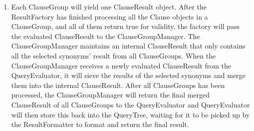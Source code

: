 \documentclass[12pt]{article}
\begin{document}
{{{{{{{{{{{{{\begin{enumerate}
\begin{figure}[H]
\end{figure}
For the case of 1 new synonym and 1 existing synonym, the ClauseResult will do the merging of result using \textit{hash join}. An unordered\_map<int, list<int> > will be created to help with the merging process, this unordered\_map will map each values of the existing synonyms to the list of the corresponding values of the corresponding new synonym. For each of the existing result combination, if the common synonym’s value has a match in the unordered\_map, the new synonym’s value will be appended to the combination. If the common synonym’s value has no match in the unordered\_map, the combination will be discarded.

If the number of combinations of the existing results is $M$, and that of the results to merge is $M$, the time complexity of this merging process would be $O(M+N)$, which is sufficiently fast.

\item Each ClauseGroup will yield one ClauseResult object. After the ResultFactory has finished processing all the Clause objects in a ClauseGroup, and all of them return true for validity, the factory will pass the evaluated ClauseResult to the ClauseGroupManager. The ClauseGroupManager maintains an internal ClauseResult that only contains all the selected synonyms’ result from all ClauseGroups. When the ClauseGroupManager receives a newly evaluated ClauseResult from the QueryEvaluator, it will sieve the results of the selected synonyms and merge them into the internal ClauseResult. After all ClauseGroups has been processed, the ClauseGroupManager will return the final merged ClauseResult of all ClauseGroups  to the QueryEvaluator and QueryEvaluator will then store this back into the QueryTree, waiting for it to be picked up by the ResultFormatter to format and return the final result.

\end{enumerate}
}}}}}}}}}}}}}
\end{document}
